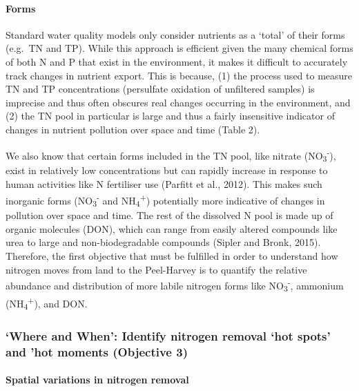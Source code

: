 \documentclass[
]{book}
\begin{document}
\hypertarget{forms}{%
\paragraph{Forms}\label{forms}}

Standard water quality models only consider nutrients as a `total' of their forms (e.g.~TN and TP). While this approach is efficient given the many chemical forms of both N and P that exist in the environment, it makes it difficult to accurately track changes in nutrient export. This is because, (1) the process used to measure TN and TP concentrations (persulfate oxidation of unfiltered samples) is imprecise and thus often obscures real changes occurring in the environment, and (2) the TN pool in particular is large and thus a fairly insensitive indicator of changes in nutrient pollution over space and time (Table 2).~

We also know that certain forms included in the TN pool, like nitrate (NO\textsubscript{3}\textsuperscript{-}), exist in relatively low concentrations but can rapidly increase in response to human activities like N fertiliser use (Parfitt et al., 2012). This makes such inorganic forms (NO\textsubscript{3}\textsuperscript{-} and NH\textsubscript{4}\textsuperscript{+}) potentially more indicative of changes in pollution over space and time. The rest of the dissolved N pool is made up of organic molecules (DON), which can range from easily altered compounds like urea to large and non-biodegradable compounds (Sipler and Bronk, 2015). Therefore, the first objective that must be fulfilled in order to understand how nitrogen moves from land to the Peel-Harvey is to quantify the relative abundance and distribution of more labile nitrogen forms like NO\textsubscript{3}\textsuperscript{-}, ammonium (NH\textsubscript{4}\textsuperscript{+}), and DON.~

\hypertarget{where-and-when-identify-nitrogen-removal-hot-spots-and-hot-moments-objective-3}{%
\subsubsection{`Where and When': Identify nitrogen removal `hot spots' and 'hot moments (Objective 3)}\label{where-and-when-identify-nitrogen-removal-hot-spots-and-hot-moments-objective-3}}

\hypertarget{spatial-variations-in-nitrogen-removal}{%
\paragraph{Spatial variations in nitrogen removal}\label{spatial-variations-in-nitrogen-removal}}
\end{document}

